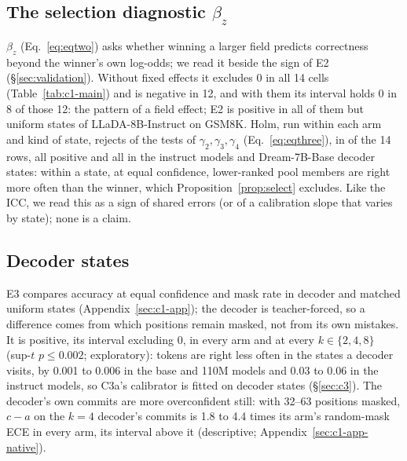 \subsection{The selection diagnostic $\beta_z$}
\label{sec:c1-beta}

$\beta_z$ (Eq.~\ref{eq:eqtwo}) asks whether winning a larger field predicts correctness beyond
the winner's own log-odds; we read it beside the sign of E2 (\S\ref{sec:validation}).
Without fixed effects it excludes 0 in all 14 cells (Table~\ref{tab:c1-main}) and is negative in
12, and with them its interval holds 0 in 8 of those 12: the pattern of a field effect; E2 is positive in all of them but uniform states of LLaDA-8B-Instruct on GSM8K.
Holm, run within each arm and kind of state, rejects  of the
 tests of $\gamma_2,\gamma_3,\gamma_4$ (Eq.~\ref{eq:eqthree}), in
 of the 14 rows, all
positive and all in the instruct models and Dream-7B-Base decoder states: within a state, at
equal confidence, lower-ranked pool members are right more often than the winner, which
Proposition~\ref{prop:select} excludes. Like the ICC, we read this as a
sign of shared errors (or of a calibration slope that varies by state); none is a claim.

\subsection{Decoder states}
\label{sec:c1-e3}

E3 compares accuracy at equal confidence and mask rate in decoder and matched uniform states
(Appendix~\ref{sec:c1-app}); the decoder is teacher-forced, so a difference comes from which
positions remain masked, not from its own mistakes. It is positive, its interval excluding 0,
in every arm and at every $k\in\{2,4,8\}$ (sup-$t$ $p\le0.002$; exploratory): tokens are right less often in the states a decoder visits, by 0.001 to 0.006 in
the base and 110M models and 0.03 to 0.06 in the instruct models, so C3a's calibrator is fitted on
decoder states (\S\ref{sec:c3}).
The decoder's own commits are more overconfident still: with 32--63 positions masked, $c-a$ on the $k{=}4$ decoder's commits is 1.8 to 4.4 times its
arm's random-mask ECE in every arm, its interval above it (descriptive;
Appendix~\ref{sec:c1-app-native}).

